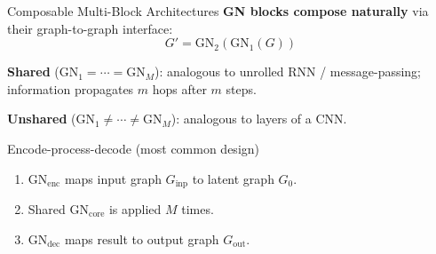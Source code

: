 \documentclass[10pt]{beamer}
\begin{document}
\begin{frame}{Composable Multi-Block Architectures}
\textbf{GN blocks compose naturally} via their graph-to-graph interface:
\begin{equation*}
    G' = \mathrm{GN}_2(\mathrm{GN}_1(G))
\end{equation*}

\textbf{Shared} ($\mathrm{GN}_1 = \cdots = \mathrm{GN}_M$): analogous to unrolled
RNN / message-passing; information propagates $m$ hops after $m$ steps.

\textbf{Unshared} ($\mathrm{GN}_1 \neq \cdots \neq \mathrm{GN}_M$): analogous to
layers of a CNN.

\vspace{0.3cm}
\begin{block}{Encode-process-decode (most common design)}
\begin{enumerate}
    \item $\mathrm{GN}_{\mathrm{enc}}$ maps input graph $G_{\mathrm{inp}}$ to latent graph $G_0$.
    \item Shared $\mathrm{GN}_{\mathrm{core}}$ is applied $M$ times.
    \item $\mathrm{GN}_{\mathrm{dec}}$ maps result to output graph $G_{\mathrm{out}}$.
\end{enumerate}
\end{block}
\end{frame}
\end{document}
